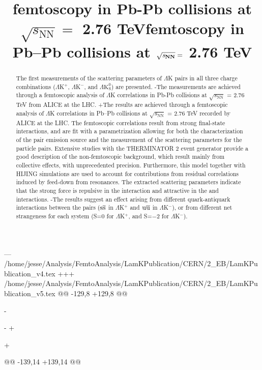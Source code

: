 --- /home/jesse/Analysis/FemtoAnalysis/LamKPublication/CERN/2_EB/LamKPublication_v4.tex
+++ /home/jesse/Analysis/FemtoAnalysis/LamKPublication/CERN/2_EB/LamKPublication_v5.tex
@@ -129,8 +129,8 @@
 
-\title{\LamK femtoscopy in Pb-Pb collisions at $\sqrt{s_{\mathrm{NN}}} = $ 2.76 TeV}
-   %
+\title{\LamK femtoscopy in Pb--Pb collisions at $\mathbf{\sqrt{{\textit s}_{NN}}} =$ 2.76 TeV}
+   %
 
@@ -139,14 +139,14 @@
 \begin{abstract}
 The first measurements of the scattering parameters of $\Lambda$K pairs in all three charge combinations ($\Lambda$K$^{+}$, $\Lambda$K$^{-}$, and $\Lambda\mathrm{K^{0}_{S}}$) are presented.
-The measurements are achieved through a femtoscopic analysis of $\Lambda$K correlations in Pb-Pb collisions at $\sqrt{s_{\mathrm{NN}}}$ = 2.76 TeV from ALICE at the LHC.  
+The results are achieved through a femtoscopic analysis of $\Lambda$K correlations in Pb--Pb collisions at $\sqrt{s_{\mathrm{NN}}}$ = 2.76 TeV recorded by ALICE at the LHC.  
 The femtoscopic correlations result from strong final-state interactions, and are fit with a parametrization allowing for both the characterization of the pair emission source and the measurement of the scattering parameters for the particle pairs.
 Extensive studies with the THERMINATOR 2 event generator provide a good description of the non-femtoscopic background, which result mainly from collective effects, with unprecedented precision.
 Furthermore, this model together with HIJING simulations are used to account for contributions from residual correlations induced by feed-down from resonances.
 The extracted scattering parameters indicate that the strong force is repulsive in the \LamKchP interaction and attractive in the \LamKchM and \LamKs interactions.
-The results suggest an effect arising from different quark-antiquark interactions between the pairs ($\rm s\overline{s}$ in $\Lambda$K$^{+}$ and $\rm u\overline{u}$ in $\Lambda$K$^{-}$), or from different net strangeness for each system (S=0 for $\Lambda$K$^{+}$, and S=$-2$ for $\Lambda$K$^{-}$).

\end{abstract}
